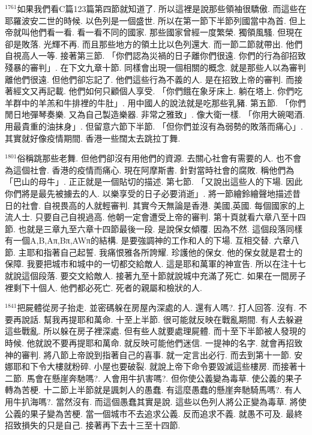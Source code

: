 \documentclass{book}
\begin{document}
$^{1761}$如果我們看C篇123篇第四節就知道了.
所以這裡是說那些領袖很驕傲.
而這些在耶羅波安二世的時候.
以色列是一個盛世.
所以在第一節下半節列國當中為首.
但上帝就叫他們看一看.
看一看不同的國家.
那些國家曾經一度繁榮.
獨領風騷.
但現在卻是敗落.
光輝不再.
而且那些地方的領土比以色列還大.
而一節二節就帶出.
他們自視高人一等.
接著第三節.
「你們認為災禍的日子離你們很遠.
你們的行為卻招致殘暴的審判」.
在下文九章十節.
同樣會出現一個相關的概念.
就是那些人以為審判離他們很遠.
但他們卻忘記了.
他們這些行為不義的人.
是在招致上帝的審判.
而接著經文又再記載.
他們如何只顧個人享受.
「你們餓在象牙床上.
躺在塔上.
你們吃羊群中的羊羔和牛排裡的牛肚」.
用中國人的說法就是吃那些乳豬.
第五節.
「你們閒日地彈琴奏樂.
又為自己製造樂器.
非常之雅致」.
像大衛一樣.
「你用大碗喝酒.
用最貴重的油抹身」.
但留意六節下半節.
「但你們並沒有為弱勢的敗落而痛心」.
其實就好像疫情期間.
香港一些闊太去跳拉丁舞.

$^{1801}$俗稱跳那些老舞.
但他們卻沒有用他們的資源.
去關心社會有需要的人.
也不會為這個社會.
香港的疫情而痛心.
現在阿摩斯書.
針對當時社會的腐敗.
稱他們為「巴山的母牛」.
正正就是一個貼切的描述.
第七節.
「又說出這些人的下場.
因此你們將是最先被擄去的人.
以樂享受的日子必要消逝」.
將一節繪鈴繪聲地描述昔日的社會.
自視畏高的人就輕審判.
其實今天無論是香港.
美國,英國.
每個國家的上流人士.
只要自己自視過高.
他朝一定會遭受上帝的審判.
第十頁就看六章八至十四節.
也就是三章九至六章十四節最後一段.
是說保女傾覆.
因為不然.
這個段落同樣有一個A,B,Aπ,Bπ,AWπ的結構.
是要強調神的工作和人的下場.
互相交替.
六章八節.
主耶和指著自己起誓.
我痛恨雅各所誇耀.
珍護他的保女.
他的保女就是君士的保障.
我要把城市和城中的一切都交給敵人.
這是耶和萬軍的神宣告.
所以在注十七就說這個段落.
要交文給敵人.
接著九至十節就說城中充滿了死亡.
如果在一間房子裡剩下十個人.
他們都必死亡.
死者的親屬和檢狀的人.

$^{1841}$把屍體從房子抬走.
並密碼躲在房屋內深處的人.
還有人嗎?.
打人回答.
沒有.
不要再說話.
幫我再提耶和萬命.
十至上半節.
很可能就反映在戰亂期間.
有人去躲避這些戰亂.
所以躲在房子裡深處.
但有些人就要處理屍體.
而十至下半節被人發現的時候.
他就說不要再提耶和萬命.
就反映可能他們迷信.
一提神的名字.
就會再招致神的審判.
將八節上帝說到指著自己的喜事.
就一定言出必行.
而去到第十一節.
安娜耶和下令大樓就粉碎.
小屋也要破裂.
就說上帝下命令要毀滅這些樓房.
而接著十二節.
馬會在懸崖奔馳嗎?.
人會用牛扒害嗎?.
但你使公義變為毒草.
使公義的果子轉為苦梗.
十二節上半節就是諷刺人的愚蠢.
有這麼愚蠢的懸崖奔馳騎馬嗎?.
有人用牛扒海嗎?.
當然沒有.
而這個愚蠢其實是說.
這些以色列人將公正變為毒草.
將使公義的果子變為苦梗.
當一個城市不去追求公義.
反而追求不義.
就愚不可及.
最終招致損失的只是自己.
接著再下去十三至十四節.
\end{document}
